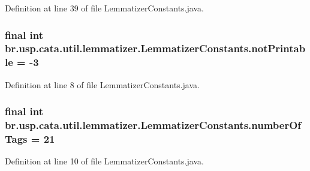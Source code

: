 Definition at line 39 of file Lemmatizer\+Constants.\+java.

\hypertarget{classbr_1_1usp_1_1cata_1_1util_1_1lemmatizer_1_1_lemmatizer_constants_acdd6705a5423fd3a1b77f4afcac5996a}{
\subsubsection[{not\+Printable}]{\setlength{\rightskip}{0pt plus 5cm}final int br.\+usp.\+cata.\+util.\+lemmatizer.\+Lemmatizer\+Constants.\+not\+Printable = -\/3\hspace{0.3cm}{\ttfamily [static]}}}\label{classbr_1_1usp_1_1cata_1_1util_1_1lemmatizer_1_1_lemmatizer_constants_acdd6705a5423fd3a1b77f4afcac5996a}


Definition at line 8 of file Lemmatizer\+Constants.\+java.

\hypertarget{classbr_1_1usp_1_1cata_1_1util_1_1lemmatizer_1_1_lemmatizer_constants_a32e953bb66616f630ac3710b27894541}{
\subsubsection[{number\+Of\+Tags}]{\setlength{\rightskip}{0pt plus 5cm}final int br.\+usp.\+cata.\+util.\+lemmatizer.\+Lemmatizer\+Constants.\+number\+Of\+Tags = 21\hspace{0.3cm}{\ttfamily [static]}}}\label{classbr_1_1usp_1_1cata_1_1util_1_1lemmatizer_1_1_lemmatizer_constants_a32e953bb66616f630ac3710b27894541}


Definition at line 10 of file Lemmatizer\+Constants.\+java.

